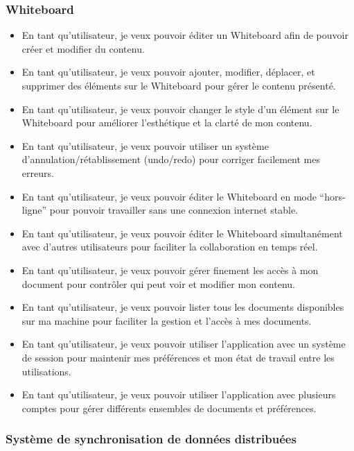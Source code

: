 \subsubsection*{Whiteboard}

\begin{itemize}
    \item En tant qu'utilisateur, je veux pouvoir éditer un Whiteboard afin de pouvoir créer et modifier du contenu.
    \item En tant qu'utilisateur, je veux pouvoir ajouter, modifier, déplacer, et supprimer des éléments sur le Whiteboard pour gérer le contenu présenté.
    \item En tant qu'utilisateur, je veux pouvoir changer le style d'un élément sur le Whiteboard pour améliorer l'esthétique et la clarté de mon contenu.
    \item En tant qu'utilisateur, je veux pouvoir utiliser un système d'annulation/rétablissement (undo/redo) pour corriger facilement mes erreurs.
    \item En tant qu'utilisateur, je veux pouvoir éditer le Whiteboard en mode “hors-ligne” pour pouvoir travailler sans une connexion internet stable.
    \item En tant qu'utilisateur, je veux pouvoir éditer le Whiteboard simultanément avec d'autres utilisateurs pour faciliter la collaboration en temps réel.
    \item En tant qu'utilisateur, je veux pouvoir gérer finement les accès à mon document pour contrôler qui peut voir et modifier mon contenu.
    \item En tant qu'utilisateur, je veux pouvoir lister tous les documents disponibles sur ma machine pour faciliter la gestion et l'accès à mes documents.
    \item En tant qu'utilisateur, je veux pouvoir utiliser l'application avec un système de session pour maintenir mes préférences et mon état de travail entre les utilisations.
    \item En tant qu'utilisateur, je veux pouvoir utiliser l'application avec plusieurs comptes pour gérer différents ensembles de documents et préférences.
\end{itemize}

\subsubsection*{Système de synchronisation de données distribuées}

